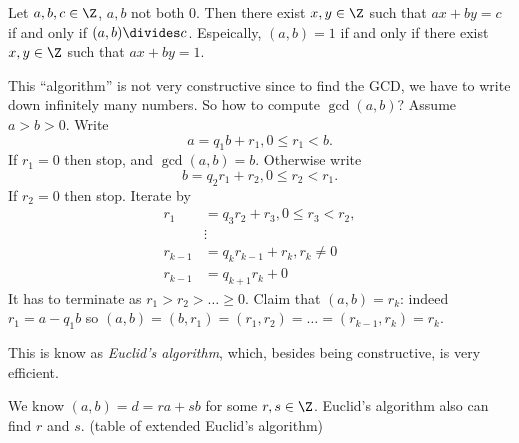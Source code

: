 \documentclass[a4paper]{article}
\begin{document}
\begin{corollary}
  Let \(a, b, c \in \Z\), \(a, b\) not both \(0\). Then there exist \(x, y \in \Z\) such that \(a x + b y = c\) if and only if \((a, b) \divides c\). Espeically, \((a, b) = 1\) if and only if there exist \(x, y \in \Z\) such that \(ax + by = 1\).
\end{corollary}

This ``algorithm'' is not very constructive since to find the GCD, we have to write down infinitely many numbers. So how to compute \(\gcd(a, b)\)? Assume \(a > b > 0\). Write
\[
  a = q_1b + r_1, 0 \leq r_1 < b.
\]
If \(r_1 = 0\) then stop, and \(\gcd(a, b) = b\). Otherwise write
\[
  b = q_2r_1 + r_2, 0 \leq r_2 < r_1.
\]
If \(r_2 = 0\) then stop. Iterate by
\begin{align*}
  r_1 &= q_3r_2 + r_3, 0 \leq r_3 < r_2, \\
      &\vdots \\
  r_{k -1} &= q_k r_{k - 1} + r_k , r_k \neq 0 \\
  r_{k - 1} &= q_{k + 1} r_k + 0
\end{align*}
It has to terminate as \(r_1 > r_2 > \dots \geq 0\). Claim that \((a, b) = r_k\): indeed \(r_1 = a - q_1b\) so \((a, b) = (b, r_1) = (r_1, r_2) = \dots = (r_{k - 1}, r_k) = r_k\).

This is know as \emph{Euclid's algorithm}, which, besides being constructive, is very efficient.

\begin{remark}
  We know \((a, b) = d = ra + sb\) for some \(r, s \in \Z\). Euclid's algorithm also can find \(r\) and \(s\). (table of extended Euclid's algorithm)
\end{remark}


\printindex
\end{document}
